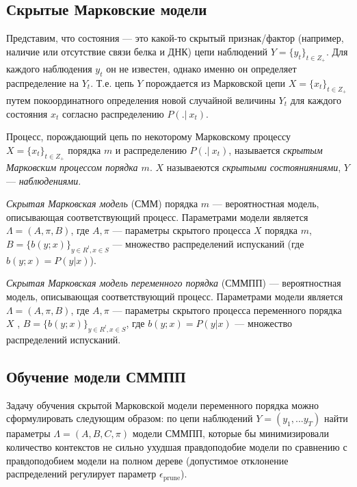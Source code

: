 \documentclass{matmex-diploma-custom}
\begin{document}
\subsection{Скрытые Марковские модели}
Представим, что состояния --- это какой-то скрытый признак/фактор (например, наличие или отсутствие связи белка и ДНК) цепи наблюдений $Y = \{y_{t}\}_{t \in Z_{+}}$. Для каждого наблюдения $y_{t}$ он не известен, однако именно он определяет распределение на $Y_{t}$.
Т.е. цепь $Y$ порождается из Марковской цепи $X = \{x_{t}\}_{t \in Z_{+}}$ путем покоординатного определения новой случайной величины $Y_{t}$ для каждого состояния $x_{t}$ согласно распределению $P(.|~x_{t})$.

\begin{definition}
Процесс, порождающий цепь по некоторому Марковскому процессу $X = \{x_{t}\}_{t \in Z_{+}}$ порядка $m$ и распределению $P(.|~x_{t})$, называется \textit{скрытым Марковским процессом порядка $m$}. 
$ X $ называеются \textit{скрытыми состоянияниями}, $Y$ --- \textit{наблюдениями}.
\end{definition}

\begin{definition}
\textit{Скрытая Марковская модель} (СММ) порядка $ m $ --- вероятностная модель, описывающая соответствующий процесс. Параметрами модели является $\Lambda=(A,\pi,B)$, где $A,\pi$ --- параметры скрытого процесса $X$ порядка $m$,  $ B = \{b(y; x)\}_{y \in R^{l}, x \in S}$ ---  множество распределений испусканий (где $ b(y; x) = P(y|x)$). 
\end{definition}

\begin{definition}
\textit{Скрытая Марковская модель переменного порядка} (СММПП) --- вероятностная модель, описывающая соответствующий процесс. Параметрами модели является $\Lambda=(A,\pi,B)$, где $A,\pi$ --- параметры скрытого процесса переменного порядка $X$ ,  $ B = \{b(y; x)\}_{y \in R^{l}, x \in S}$, где $ b(y; x) = P(y|x)$ ---  множество распределений испусканий. 
\end{definition}


\subsection{Обучение модели СММПП}
Задачу обучения скрытой Марковской модели переменного порядка можно сформулировать следующим образом: 
по цепи наблюдений $ Y = (y_{1}, ... y_{T}) $ найти параметры $\Lambda = (A,B,C,\pi)$ модели СММПП, которые бы минимизировали количество контекстов не сильно ухудшая правдоподобие модели по сравнению с правдоподобием модели на полном дереве (допустимое отклонение распределений регулирует параметр $ \epsilon_{\text{prune}} $).
\end{document}
